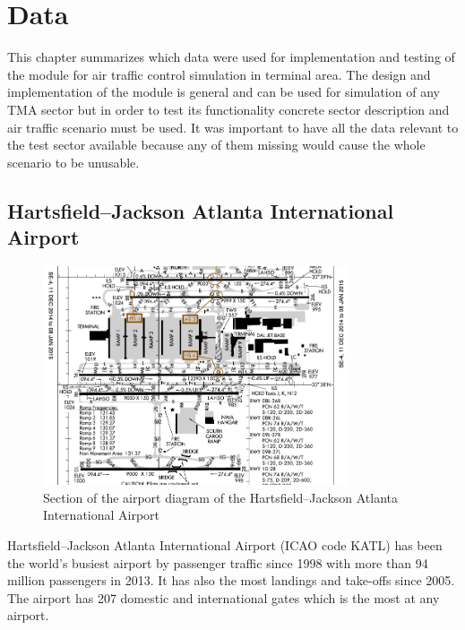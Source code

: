 \chapter{Data}

\label{section:data}

This chapter summarizes which data were used for implementation and testing of the module for air traffic control simulation in terminal area. The design and implementation of the module is general and can be used for simulation of any TMA sector but in order to test its functionality concrete sector description and air traffic scenario must be used. It was important to have all the data relevant to the test sector available because any of them missing would cause the whole scenario to be unusable.

\section{Hartsfield–Jackson Atlanta International Airport}

\begin{figure}[h]
    \centering
    \includegraphics[width=0.8\textwidth]{figures/atlanta-diagram.pdf}
    \caption{Section of the airport diagram of the Hartsfield–Jackson Atlanta International Airport \cite{atlanta-diagram}}
    \label{fig:atlanta-diagram}
\end{figure}

Hartsfield–Jackson Atlanta International Airport (ICAO code KATL) has been the world's busiest airport by passenger traffic since 1998 with more than 94 million passengers in 2013. It has also the most landings and take-offs since 2005. The airport has 207 domestic and international gates which is the most at any airport. \cite{atlanta}

